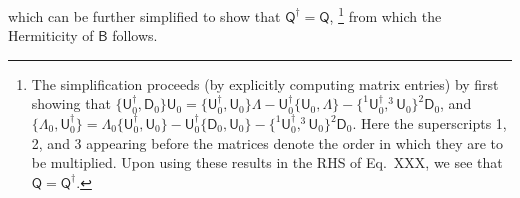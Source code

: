 %
which can be further simplified to show that $\mathsf{Q}^{\dagger} = \mathsf{Q}$,%
\footnote{The simplification proceeds (by explicitly computing matrix entries) by first showing that
  $\{\mathsf{U}_{0}^{\dagger}, \mathsf{D}_{0}\}\mathsf{U}_{0} = \{\mathsf{U}_{0}^{\dagger}, \mathsf{U}_{0}\}\Lambda - \mathsf{U}_{0}^{\dagger}\{\mathsf{U}_{0}, \Lambda\} - \{ ^{1}\mathsf{U}_{0}^{\dagger}, ^{3}\mathsf{U}_{0}\}^{2}\mathsf{D}_{0}$,
  and
  $\{\Lambda_{0}, \mathsf{U}_{0}^{\dagger}\} = \Lambda_{0}\{\mathsf{U}_{0}^{\dagger},\mathsf{U}_{0}\} - \mathsf{U}_{0}^{\dagger}\{\mathsf{D}_{0},\mathsf{U}_{0}\} - \{^{1}\mathsf{U}_{0}^{\dagger},^{3}\mathsf{U}_{0}\}^{2}\mathsf{D}_{0}$.
  Here the superscripts 1, 2, and 3 appearing before the matrices denote the order in which they are to be multiplied.
  Upon using these results in the RHS of Eq.~XXX, we see that $\mathsf{Q}=\mathsf{Q}^{\dagger}$.
}
from which the Hermiticity of $\mathsf{B}$ follows.

